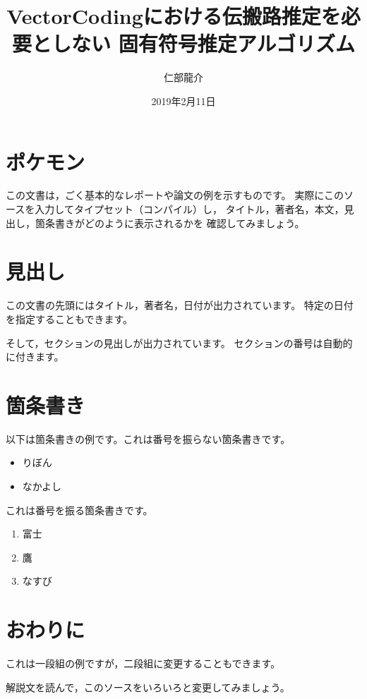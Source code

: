 \documentclass{jsarticle}
\begin{document}
\title{VectorCodingにおける伝搬路推定を必要としない
固有符号推定アルゴリズム}
\author{仁部龍介}
\date{2019年2月11日}
\maketitle

\section{ポケモン}

この文書は，ごく基本的なレポートや論文の例を示すものです。
実際にこのソースを入力してタイプセット（コンパイル）し，
タイトル，著者名，本文，見出し，箇条書きがどのように表示されるかを
確認してみましょう。

\section{見出し}

この文書の先頭にはタイトル，著者名，日付が出力されています。
特定の日付を指定することもできます。

そして，セクションの見出しが出力されています。
セクションの番号は自動的に付きます。

\section{箇条書き}

以下は箇条書きの例です。これは番号を振らない箇条書きです。

\begin{itemize}
  \item りぼん
  \item なかよし
\end{itemize}

これは番号を振る箇条書きです。

\begin{enumerate}
  \item 富士
  \item 鷹
  \item なすび
\end{enumerate}

\section{おわりに}

これは一段組の例ですが，二段組に変更することもできます。

解説文を読んで，このソースをいろいろと変更してみましょう。
\end{document}
